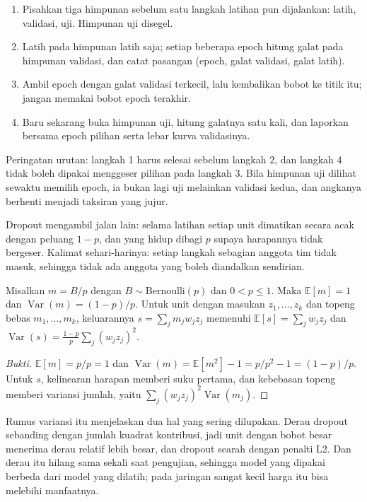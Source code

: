\begin{resep}
\begin{enumerate}
  \item Pisahkan tiga himpunan sebelum satu langkah latihan pun dijalankan: latih,
        validasi, uji. Himpunan uji disegel.
  \item Latih pada himpunan latih saja; setiap beberapa epoch hitung galat pada
        himpunan validasi, dan catat pasangan (epoch, galat validasi, galat latih).
  \item Ambil epoch dengan galat validasi terkecil, lalu kembalikan bobot ke titik itu;
        jangan memakai bobot epoch terakhir.
  \item Baru sekarang buka himpunan uji, hitung galatnya satu kali, dan laporkan
        bersama epoch pilihan serta lebar kurva validasinya.
\end{enumerate}
Peringatan urutan: langkah 1 harus selesai sebelum langkah 2, dan langkah 4 tidak boleh
dipakai menggeser pilihan pada langkah 3. Bila himpunan uji dilihat sewaktu memilih
epoch, ia bukan lagi uji melainkan validasi kedua, dan angkanya berhenti menjadi
taksiran yang jujur.
\end{resep}

Dropout mengambil jalan lain: selama latihan setiap unit dimatikan secara acak dengan
peluang $1-p$, dan yang hidup dibagi $p$ supaya harapannya tidak bergeser. Kalimat
sehari-harinya: setiap langkah sebagian anggota tim tidak masuk, sehingga tidak ada
anggota yang boleh diandalkan sendirian.

\begin{lemma}
Misalkan $m=B/p$ dengan $B\sim\mathrm{Bernoulli}(p)$ dan $0<p\le1$. Maka
$\mathbb{E}[m]=1$ dan $\operatorname{Var}(m)=(1-p)/p$. Untuk unit dengan masukan
$z_1,\dots,z_k$ dan topeng bebas $m_1,\dots,m_k$, keluarannya
$s=\sum_j m_jw_jz_j$ memenuhi $\mathbb{E}[s]=\sum_jw_jz_j$ dan
$\operatorname{Var}(s)=\frac{1-p}{p}\sum_j(w_jz_j)^2$.
\end{lemma}

\begin{proof}[Bukti]
$\mathbb{E}[m]=p/p=1$ dan $\operatorname{Var}(m)=\mathbb{E}[m^2]-1=p/p^2-1=(1-p)/p$.
Untuk $s$, kelinearan harapan memberi suku pertama, dan kebebasan topeng memberi
variansi jumlah, yaitu $\sum_j(w_jz_j)^2\operatorname{Var}(m_j)$.
\end{proof}

Rumus variansi itu menjelaskan dua hal yang sering dilupakan. Derau dropout sebanding
dengan jumlah kuadrat kontribusi, jadi unit dengan bobot besar menerima derau relatif
lebih besar, dan dropout searah dengan penalti L2. Dan derau itu hilang sama sekali saat
pengujian, sehingga model yang dipakai berbeda dari model yang dilatih; pada jaringan
sangat kecil harga itu bisa melebihi manfaatnya.

